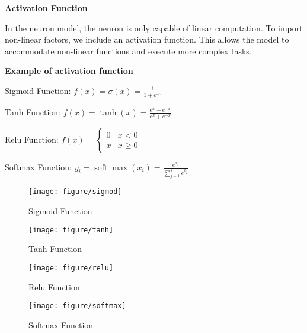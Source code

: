 \documentclass{article}
\begin{document}
    \hspace*{\fill}
    \begin{mdframed}[hidealllines=false,backgroundcolor=white!20]
    \textbf{Activation Function}

    In the neuron model, the neuron is only capable of linear computation. To import non-linear factors, we include an activation function. This allows the model to accommodate non-linear functions and execute more complex tasks.

    \textbf{ Example of activation function}


        \hspace*{\fill}

        Sigmoid Function:
        $f(x)=\sigma(x)=\frac{1}{1+e^{-x}}$
        \hspace*{\fill}


        \hspace*{\fill}

        Tanh Function:
        $f(x)=\tanh (x)=\frac{e^x-e^{-x}}{e^x+e^{-x}}$
        \hspace*{\fill}

        \hspace*{\fill}

        Relu Function:
        $f(x)= \begin{cases}0 & x<0 \\ x & x \geq 0\end{cases}$
        \hspace*{\fill}

        \hspace*{\fill}

        Softmax Function:
        $y_i=\operatorname{soft} \max \left(x_i\right)=\frac{e^{x_i}}{\sum_{j=1}^k e^{x_j}}$
        \hspace*{\fill}


    \end{mdframed}




    \begin{figure}[htbp]
    \centering
    \begin{minipage}[t]{0.48\textwidth}
    \centering
    \texttt{[image: figure/sigmod]}
    \caption{Sigmoid Function}
    \end{minipage}
    \begin{minipage}[t]{0.48\textwidth}
    \centering
    \texttt{[image: figure/tanh]}
    \caption{Tanh Function}
    \end{minipage}

    \centering
    \begin{minipage}[t]{0.48\textwidth}
    \centering
    \texttt{[image: figure/relu]}
    \caption{Relu Function}
    \end{minipage}
    \begin{minipage}[t]{0.48\textwidth}
    \centering
    \texttt{[image: figure/softmax]}
    \caption{Softmax Function}
    \end{minipage}
    \end{figure}
\end{document}

